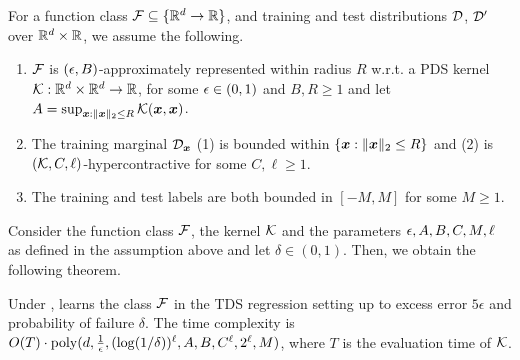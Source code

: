 \documentclass[11pt]{article} %
\numberwithin{equation}{section}
\begin{document}
\begin{assumption}\label{assumption:bounded}
    For a function class ${\mathcal{F}}\subseteq\{\mathbb{R}^d\to \mathbb{R}\}$, and training and test distributions ${\mathcal{D}}$, ${\mathcal{D}}'$ over $\mathbb{R}^d\times \mathbb{R}$, we assume the following.
    \begin{enumerate}
        \item ${\mathcal{F}}$ is $({\epsilon},B)$-approximately represented within radius $R$ w.r.t. a PDS kernel $\mathcal{K}:\mathbb{R}^d\times \mathbb{R}^d \to \mathbb{R}$, for some ${\epsilon}\in(0,1)$ and $B,R\ge 1$ and let $A = \sup_{{\bm{x}}:\|{\bm{x}}\|_2 \le R}\mathcal{K}({\bm{x}},{\bm{x}})$.
        \item The training marginal ${\mathcal{D}}_{{\bm{x}}}$ (1) is bounded within $\{{\bm{x}}: \|{\bm{x}}\|_2 \le R\}$ and (2) is $(\mathcal{K},C,\ell)$-hypercontractive for some $C,\ell \ge 1$.
        \item The training and test labels are both bounded in $[-M,M]$ for some $M\ge 1$. 
    \end{enumerate}
\end{assumption}

Consider the function class ${\mathcal{F}}$, the kernel $\mathcal{K}$ and the parameters ${\epsilon}, A,B,C,M,\ell$ as defined in the assumption above and let $\delta\in(0,1)$. Then, we obtain the following theorem.

\begin{theorem}\label{theorem:tds-via-kernels}
    Under ,  learns the class ${\mathcal{F}}$ in the TDS regression setting up to excess error $5\epsilon$ and probability of failure $\delta$. The time complexity is $O(T) \cdot \mathrm{poly}(d,\frac{1}{{\epsilon}}, (\log(1/\delta))^\ell, A, B, C^\ell, 2^\ell, M)$, where $T$ is the evaluation time of $\mathcal{K}$.
\end{theorem}
\end{document}

